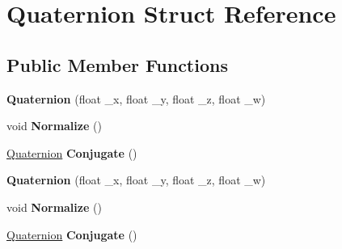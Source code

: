 \hypertarget{structQuaternion}{\section{Quaternion Struct Reference}
\label{structQuaternion}
}
\subsection*{Public Member Functions}
\begin{DoxyCompactItemize}
\item 
\hypertarget{structQuaternion_af17f4f2abafce070ff473979f18954e1}{{\bfseries Quaternion} (float \-\_\-x, float \-\_\-y, float \-\_\-z, float \-\_\-w)}\label{structQuaternion_af17f4f2abafce070ff473979f18954e1}

\item 
\hypertarget{structQuaternion_a5c08e0c7533e0c1a526a7401f4754910}{void {\bfseries Normalize} ()}\label{structQuaternion_a5c08e0c7533e0c1a526a7401f4754910}

\item 
\hypertarget{structQuaternion_a204460c32aa96a444929934af3910389}{\hyperlink{structQuaternion}{Quaternion} {\bfseries Conjugate} ()}\label{structQuaternion_a204460c32aa96a444929934af3910389}

\item 
\hypertarget{structQuaternion_af17f4f2abafce070ff473979f18954e1}{{\bfseries Quaternion} (float \-\_\-x, float \-\_\-y, float \-\_\-z, float \-\_\-w)}\label{structQuaternion_af17f4f2abafce070ff473979f18954e1}

\item 
\hypertarget{structQuaternion_a5c08e0c7533e0c1a526a7401f4754910}{void {\bfseries Normalize} ()}\label{structQuaternion_a5c08e0c7533e0c1a526a7401f4754910}

\item 
\hypertarget{structQuaternion_a204460c32aa96a444929934af3910389}{\hyperlink{structQuaternion}{Quaternion} {\bfseries Conjugate} ()}\label{structQuaternion_a204460c32aa96a444929934af3910389}

\end{DoxyCompactItemize}
